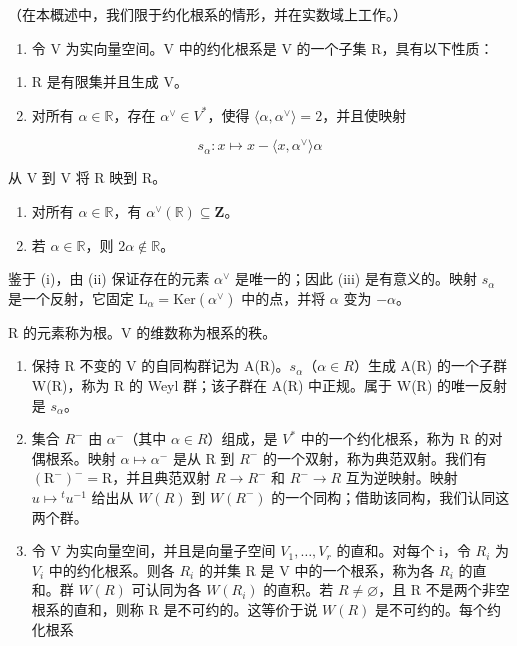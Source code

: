
（在本概述中，我们限于约化根系的情形，并在实数域上工作。）

\begin{enumerate}
\def\labelenumi{\arabic{enumi})}
\tightlist
\item
  令 V 为实向量空间。V 中的约化根系是 V 的一个子集 R，具有以下性质：
\end{enumerate}

\begin{enumerate}
\def\labelenumi{(\roman{enumi})}
\item
  R 是有限集并且生成 V。
\item
  对所有 \(\alpha \in \mathbb{R}\)，存在 \(\alpha^{\vee} \in V^{*}\)，使得 \(\langle \alpha, \alpha^{\vee} \rangle = 2\)，并且使映射
\end{enumerate}

\[
s _ {\alpha}: x \mapsto x - \langle x, \alpha^{\vee} \rangle \alpha
\]

从 V 到 V 将 R 映到 R。

\begin{enumerate}
\def\labelenumi{(\roman{enumi})}
\setcounter{enumi}{2}
\item
  对所有 \(\alpha \in \mathbb{R}\)，有 \(\alpha^{\vee}(\mathbb{R}) \subseteq \mathbf{Z}\)。
\item
  若 \(\alpha \in \mathbb{R}\)，则 \(2\alpha \notin \mathbb{R}\)。
\end{enumerate}

鉴于 (i)，由 (ii) 保证存在的元素 \(\alpha^{\vee}\) 是唯一的；因此 (iii) 是有意义的。映射 \(s_{\alpha}\) 是一个反射，它固定 \(\mathrm{L}_{\alpha} = \mathrm{Ker}(\alpha^{\vee})\) 中的点，并将 \(\alpha\) 变为 \(-\alpha\)。

R 的元素称为根。V 的维数称为根系的秩。

\begin{enumerate}
\def\labelenumi{\arabic{enumi})}
\setcounter{enumi}{1}
\item
  保持 R 不变的 V 的自同构群记为 A(R)。\(s_{\alpha}\)（\(\alpha \in R\)）生成 A(R) 的一个子群 W(R)，称为 R 的 Weyl 群；该子群在 A(R) 中正规。属于 W(R) 的唯一反射是 \(s_{\alpha}\)。
\item
  集合 \(R^{-}\) 由 \(\alpha^{-}\)（其中 \(\alpha \in R\)）组成，是 \(V^{*}\) 中的一个约化根系，称为 R 的对偶根系。映射 \(\alpha \mapsto \alpha^{-}\) 是从 R 到 \(R^{-}\) 的一个双射，称为典范双射。我们有 \((\mathrm{R}^{-})^{-} = \mathrm{R}\)，并且典范双射 \(R \to R^{-}\) 和 \(R^{-} \to R\) 互为逆映射。映射 \(u \mapsto {}^{t}u^{-1}\) 给出从 \(W(R)\) 到 \(W(R^{-})\) 的一个同构；借助该同构，我们认同这两个群。
\item
  令 V 为实向量空间，并且是向量子空间 \(V_{1},\ldots,V_{r}\) 的直和。对每个 i，令 \(R_{i}\) 为 \(V_{i}\) 中的约化根系。则各 \(R_{i}\) 的并集 R 是 V 中的一个根系，称为各 \(R_{i}\) 的直和。群 \(W(R)\) 可认同为各 \(W(R_{i})\) 的直积。若 \(R \neq \varnothing\)，且 R 不是两个非空根系的直和，则称 R 是不可约的。这等价于说 \(W(R)\) 是不可约的。每个约化根系
\end{enumerate}

